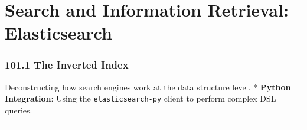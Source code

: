 \hypertarget{search-and-information-retrieval-elasticsearch}{%
\chapter{Search and Information Retrieval:
Elasticsearch}\label{search-and-information-retrieval-elasticsearch}}

\hypertarget{the-inverted-index}{%
\subsection{101.1 The Inverted Index}\label{the-inverted-index}}

Deconstructing how search engines work at the data structure level. *
\textbf{Python Integration}: Using the
\passthrough{\lstinline!elasticsearch-py!} client to perform complex DSL
queries.

\begin{center}\rule{0.5\linewidth}{0.5pt}\end{center}
